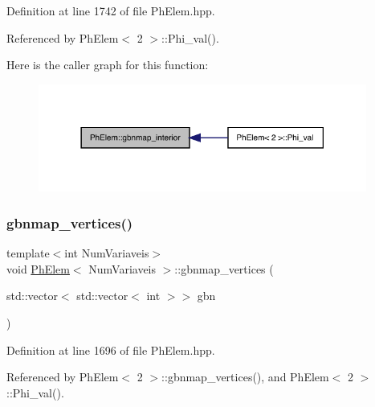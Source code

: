 Definition at line 1742 of file Ph\+Elem.\+hpp.



Referenced by Ph\+Elem$<$ 2 $>$\+::\+Phi\+\_\+val().

Here is the caller graph for this function\+:
\nopagebreak
\begin{figure}[H]
\begin{center}
\leavevmode
\includegraphics[width=306pt]{classPhElem_ae6f35113c182e2678646552e6c4a752c_icgraph}
\end{center}
\end{figure}
\mbox{\label{classPhElem_ad8d5bac3d1866cfe20daec73fc405b05}} 
\subsubsection{\texorpdfstring{gbnmap\+\_\+vertices()}{gbnmap\_vertices()}\hspace{0.1cm}{\footnotesize\ttfamily [1/2]}}
{\footnotesize\ttfamily template$<$int Num\+Variaveis$>$ \\
void \hyperlink{classPhElem}{Ph\+Elem}$<$ Num\+Variaveis $>$\+::gbnmap\+\_\+vertices (\begin{DoxyParamCaption}\item[{std\+::vector$<$ std\+::vector$<$ int $>$$>$}]{gbn }\end{DoxyParamCaption})}



Definition at line 1696 of file Ph\+Elem.\+hpp.



Referenced by Ph\+Elem$<$ 2 $>$\+::gbnmap\+\_\+vertices(), and Ph\+Elem$<$ 2 $>$\+::\+Phi\+\_\+val().

